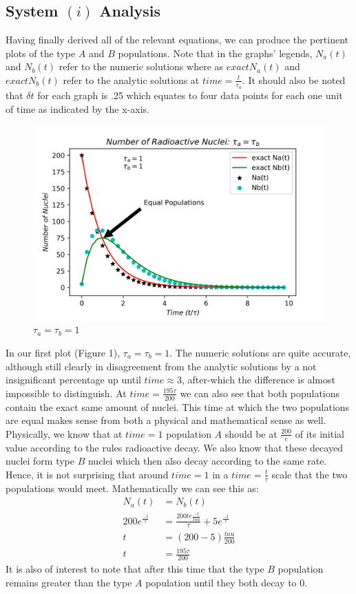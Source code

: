 \documentclass[twocolumn]{article}
\begin{document}
\subsection{System $(i)$ Analysis}
\hspace{\parindent} Having finally derived all of the relevant equations, we can produce the pertinent plots of the type $A$ and $B$ populations. Note that in the graphs' legends, $N_a(t)$ and $N_b(t)$ refer to the numeric solutions  where as $exact N_a(t)$ and $exact N_b(t)$ refer to the analytic solutions at $time=\frac{t}{\tau_a}$. It should also be noted that $\delta t$ for each graph is .25 which equates to four data points for each one unit of time as indicated by the x-axis.

\begin{figure}[h]
\caption{$\tau_a = \tau_b = 1$}
\centering
\includegraphics[scale=.6]{Radioactive_DecayAequalB}
\end{figure}

In our first plot (Figure 1), $\tau_a = \tau_b = 1$. The numeric solutions are quite accurate, although still clearly in disagreement from the analytic solutions by a not insignificant percentage up until $time \approx 3$, after-which the difference is almost impossible to distinguish. At $time=\frac{195\tau}{200}$ we can also see that both populations contain the exact same amount of nuclei. This time at which the two populations are equal makes sense from both a physical and mathematical sense as well. Physically, we know that at $time=1$ population $A$ should be at $\frac{200}{e}$ of its initial value according to the rules radioactive decay. We also know that these decayed nuclei form type $B$ nuclei which then also decay according to the same rate. Hence, it is not surprising that around $time=1$ in a $time = \frac{t}{\tau}$ scale that the two populations would meet. Mathematically we can see this as:
	\begin{align}
	N_a(t)&=N_b(t)\\
	200e^{\frac{-t}{\tau}}&=\frac{200te{\frac{-t}{tau}}}{\tau}+5e^{\frac{-t}{\tau}}\\
	t&=\left(200-5\right)\frac{tau}{200}\\
	t&=\frac{195\tau}{200}
	\end{align}
It is also of interest to note that after this time that the type $B$ population remains greater than the type $A$ population until they both decay to 0.
\end{document}
